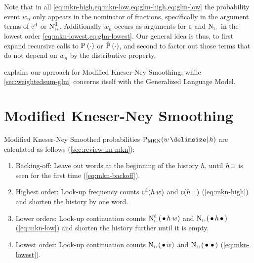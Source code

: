 Note that in all \cref{eq:mkn-high,eq:mkn-low,eq:glm-high,eq:glm-low} the
probability event $w_n$ only appears in the nominator of fractions, specifically
in the argument terms of $\DiscountedCount$ or $\DiscountedCount*$.
Additionally $w_n$ occurs as arguments for $\operatorname{c}$ and $\ContCountIp$ in the
lowest order \cref{eq:mkn-lowest,eq:glm-lowest}.
Our general idea is thus, to first expand recursive calls to
$\Prob(\DummyArg)$ or $\Prob*(\DummyArg)$, and second to factor
out those terms that do not depend on $w_n$ by the distributive property.

 explains our aprroach for Modified Kneser-Ney
Smoothing, while \cref{sec:weightedsum-glm} concerns itself with the Generalized
Language Model.


\clearpage
\section{Modified Kneser-Ney Smoothing}
\label{sec:weightedsum-mkn}

Modified Kneser-Ney Smoothed probabilities $\ProbMKN{w}{h}$ are calculated as
follows (\cref{sec:review-lm-mkn}):
\begin{enumerate}
  \item Backing-off: Leave out words at the beginning of the history $h$, until
    $h \Skp$ is seen for the first time (\cref{eq:mkn-backoff}).
  \item Highest order: Look-up frequency counts $\DiscountedCount(h \: w)$ and
    $\Count(h \Skp)$ (\cref{eq:mkn-high}) and shorten the history by one word.
  \item Lower orders: Look-up continuation counts $\DiscountedCount*(\WSkp h \: w)$
    and $\ContCountIp(\WSkp h \WSkp)$ (\cref{eq:mkn-low}) and shorten the
    history further until it is empty.
  \item Lowest order: Look-up continuation counts $\ContCountIp(\WSkp w)$ and
    $\ContCountIp(\WSkp \WSkp)$ (\cref{eq:mkn-lowest}).
\end{enumerate}

\newcommand{\ProbMKNcab}[1]
  {\frac{\DiscountedCount(w_1 w_2 w_3) + \gamma(w_1 w_2) #1}{\Count(w_1 w_2 \Skp)}}
\newcommand{\ProbMKNcb}[1]
  {\frac{\DiscountedCount*(\WSkp w_2 w_3) + \gamma(w_2) #1}{\ContCountIp(\WSkp w_2 \WSkp)}}
\newcommand{\ProbMKNc}
  {\frac{\ContCountIp(\WSkp w_3)}{\ContCountIp(\WSkp \WSkp)}}

